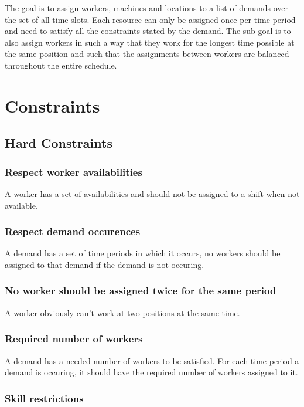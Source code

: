 \documentclass[../thesis.tex]{subfiles}
\begin{document}
The goal is to assign workers, machines and locations to a list of demands over the set of all time slots.
Each resource can only be assigned once per time period and need to satisfy all the constraints stated by the demand. 
The sub-goal is to also assign workers in such a way that they work for the longest time possible at the same position and 
 such that the assignments between workers are balanced throughout the entire schedule.

\section{Constraints}
\subsection{Hard Constraints}

\subsubsection{Respect worker availabilities}

A worker has a set of availabilities and should not be assigned to a 
shift when not available.

\subsubsection{Respect demand occurences}

A demand has a set of time periods in which it occurs,
no workers should be assigned to that demand if the demand is not 
occuring.

\subsubsection{No worker should be assigned twice for the same period}

A worker obviously can't work at two positions at the same time. 

\subsubsection{Required number of workers}

A demand has a needed number of workers to be satisfied. 
For each time period a demand is occuring, it should have the required 
number of workers assigned to it.

\subsubsection{Skill restrictions}
\end{document}
